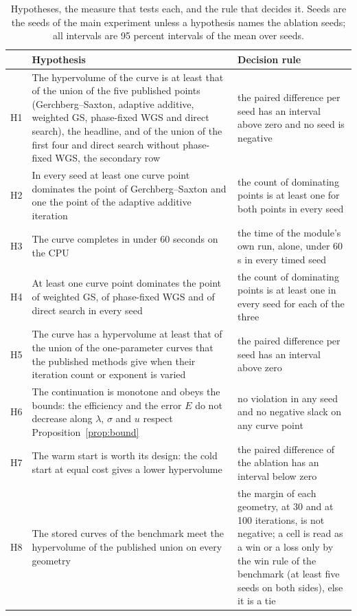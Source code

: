 \begin{table}[t]
\centering\small
\caption{Hypotheses, the measure that tests each, and the rule that decides it. Seeds are the seeds of the main experiment unless a hypothesis names the ablation seeds; all intervals are 95 percent intervals of the mean over seeds.}
\label{tab:hyp}
\begin{tabular}{@{}p{0.7cm} p{6.0cm} p{7.4cm}@{}}
\toprule
 & Hypothesis & Decision rule\\
\midrule
H1 & The hypervolume of the curve is at least that of the union of the five published points (Gerchberg--Saxton, adaptive additive, weighted GS, phase-fixed WGS and direct search), the headline, and of the union of the first four and direct search without phase-fixed WGS, the secondary row & the paired difference per seed has an interval above zero and no seed is negative\\
H2 & In every seed at least one curve point dominates the point of Gerchberg--Saxton and one the point of the adaptive additive iteration & the count of dominating points is at least one for both points in every seed\\
H3 & The curve completes in under 60 seconds on the CPU & the time of the module's own run, alone, under 60 s in every timed seed\\
H4 & At least one curve point dominates the point of weighted GS, of phase-fixed WGS and of direct search in every seed & the count of dominating points is at least one in every seed for each of the three\\
H5 & The curve has a hypervolume at least that of the union of the one-parameter curves that the published methods give when their iteration count or exponent is varied & the paired difference per seed has an interval above zero\\
H6 & The continuation is monotone and obeys the bounds: the efficiency and the error $E$ do not decrease along $\lambda$, $\sigma$ and $u$ respect Proposition~\ref{prop:bound} & no violation in any seed and no negative slack on any curve point\\
H7 & The warm start is worth its design: the cold start at equal cost gives a lower hypervolume & the paired difference of the ablation has an interval below zero\\
H8 & The stored curves of the benchmark meet the hypervolume of the published union on every geometry & the margin of each geometry, at 30 and at 100 iterations, is not negative; a cell is read as a win or a loss only by the win rule of the benchmark (at least five seeds on both sides), else it is a tie\\
\bottomrule
\end{tabular}
\end{table}

